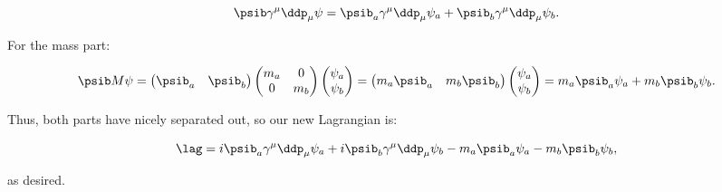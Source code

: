 \begin{equation}
    \psib \gamma^{\mu}\ddp_{\mu} \psi = \psib_a \gamma^{\mu}\ddp_{\mu} \psi_a + \psib_b \gamma^{\mu}\ddp_{\mu} \psi_b.
\end{equation}

For the mass part:

\begin{equation}
    \psib M \psi = \begin{pmatrix}\psib_a & \psib_b\end{pmatrix}\begin{pmatrix}m_a & 0 \\ 0 & m_b\end{pmatrix}\begin{pmatrix}\psi_a \\ \psi_b\end{pmatrix} = \begin{pmatrix}m_a\psib_a & m_b\psib_b\end{pmatrix}\begin{pmatrix}\psi_a \\ \psi_b\end{pmatrix} = m_a\psib_a\psi_a + m_b\psib_b\psi_b.
\end{equation}

Thus, both parts have nicely separated out, so our new Lagrangian is:

\begin{equation}
    \lag = i\psib_a \gamma^{\mu}\ddp_{\mu} \psi_a + i\psib_b \gamma^{\mu}\ddp_{\mu} \psi_b - m_a\psib_a\psi_a - m_b\psib_b\psi_b,
\end{equation}

as desired.